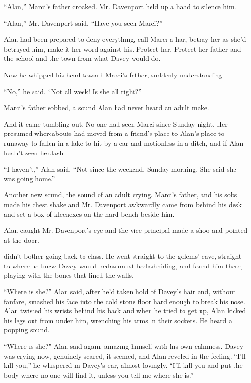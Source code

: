 ``Alan,'' Marci's father croaked.  Mr.  Davenport held up a hand to
silence him.

``Alan,'' Mr.  Davenport said.  ``Have you seen Marci?''

Alan had been prepared to deny everything, call Marci a liar, betray
her as she'd betrayed him, make it her word against his.  Protect her. 
Protect her father and the school and the town from what Davey would
do.

Now he whipped his head toward Marci's father, suddenly understanding.

``No,'' he said.  ``Not all week!  Is she all right?''

Marci's father sobbed, a sound Alan had never heard an adult make.

And it came tumbling out.  No one had seen Marci since Sunday night. 
Her presumed whereabouts had moved from a friend's place to Alan's
place to runaway to fallen in a lake to hit by a car and motionless in
a ditch, and if Alan hadn't seen herdash{}

``I haven't,'' Alan said.  ``Not since the weekend.  Sunday morning. 
She said she was going home.''

Another new sound, the sound of an adult crying.  Marci's father, and
his sobs made his chest shake and Mr.  Davenport awkwardly came from
behind his desk and set a box of kleenexes on the hard bench beside
him.

Alan caught Mr.  Davenport's eye and the vice principal made a shoo
and pointed at the door.

 didn't bother going back to class.  He went straight to the
golems' cave, straight to where he knew Davey would bedash{}must
bedash{}hiding, and found him there, playing with the bones that lined
the walls.

``Where is she?'' Alan said, after he'd taken hold of Davey's hair
and, without fanfare, smashed his face into the cold stone floor hard
enough to break his nose.  Alan twisted his wrists behind his back and
when he tried to get up, Alan kicked his legs out from under him,
wrenching his arms in their sockets.  He heard a popping sound.

``Where is she?'' Alan said again, amazing himself with his own
calmness.  Davey was crying now, genuinely scared, it seemed, and Alan
reveled in the feeling.  ``I'll kill you,'' he whispered in Davey's
ear, almost lovingly.  ``I'll kill you and put the body where no one
will find it, unless you tell me where she is.''

